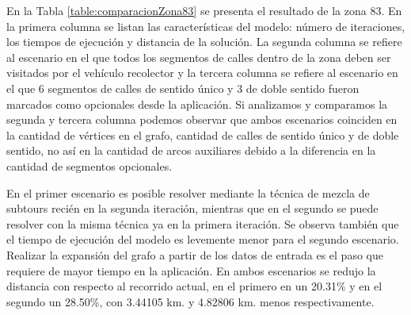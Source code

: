 En la Tabla \ref{table:comparacionZona83} se presenta el resultado de la zona 83. En la primera columna se listan las características del modelo: número de iteraciones, los tiempos de ejecución y distancia de la solución. La segunda columna se refiere al escenario en el que todos los segmentos de calles dentro de la zona deben ser visitados por el vehículo recolector y la tercera columna se refiere al escenario en el que 6 segmentos de calles de sentido único y 3 de doble sentido fueron marcados como opcionales desde la aplicación. Si analizamos y comparamos la segunda y tercera columna podemos observar que ambos escenarios coinciden en la cantidad de vértices en el grafo, cantidad de calles de sentido único y de doble sentido, no así en la cantidad de arcos auxiliares debido a la diferencia en la cantidad de segmentos opcionales.

En el primer escenario es posible resolver mediante la técnica de mezcla de subtours recién en la segunda iteración, mientras que en el segundo se puede resolver con la misma técnica ya en la primera iteración. Se observa también que el tiempo de ejecución del modelo es levemente menor para el segundo escenario. Realizar la expansión del grafo a partir de los datos de entrada es el paso que requiere de mayor tiempo en la aplicación. En ambos escenarios se redujo la distancia con respecto al recorrido actual, en el primero en un 20.31\%  y en el segundo un 28.50\%, con 3.44105 km. y 4.82806 km. menos respectivamente.

